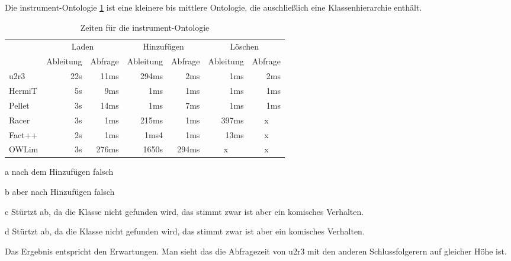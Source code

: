 Die instrument-Ontologie \ref{table-time-instrument} ist eine kleinere bis mittlere Ontologie, die auschließlich eine Klassenhierarchie enthält.

\begin{table}[htbp]
\caption{Zeiten für die instrument-Ontologie}
\label{table-time-instrument}
\begin{center}
\begin{threeparttable}
\begin{tabular}{l|r|r|r|r|r|r|}
\cline{2-7}
 & \multicolumn{2}{|c|}{Laden} & \multicolumn{2}{|c|}{Hinzufügen} & \multicolumn{2}{|c|}{Löschen} \\
\cline{2-7}
 & \multicolumn{1}{|c|}{Ableitung} & \multicolumn{1}{|c|}{Abfrage} & \multicolumn{1}{|c|}{Ableitung} & \multicolumn{1}{|c|}{Abfrage} & \multicolumn{1}{|c|}{Ableitung} & \multicolumn{1}{|c|}{Abfrage} \\
\hline
\multicolumn{1}{|l|}{u2r3} & 22s & 11ms & 294ms & 2ms & 1ms & 2ms \\ \hline
\multicolumn{1}{|l|}{HermiT\tnote{a}} & 5s & 9ms & 1ms & 1ms & 1ms & 1ms \\ \hline
\multicolumn{1}{|l|}{Pellet\tnote{b}} & 3s & 14ms & 1ms & 7ms & 1ms & 1ms \\ \hline
\multicolumn{1}{|l|}{Racer\tnote{c}} & 3s & 1ms & 215ms & 1ms & 397ms & \multicolumn{1}{c|}{x} \\ \hline
\multicolumn{1}{|l|}{Fact++\tnote{d}} & 2s & 1ms & 1ms4 & 1ms & 13ms & \multicolumn{1}{c|}{x} \\ \hline
\multicolumn{1}{|l|}{OWLim} & 3s & 276ms & 1650s & 294ms & \multicolumn{1}{c|}{x} & \multicolumn{1}{c|}{x} \\ \hline
\end{tabular}
\begin{tablenotes}
	\item[a] nach dem Hinzufügen falsch
	\item[b] aber nach Hinzufügen falsch
	\item[c] Stürtzt ab, da die Klasse nicht gefunden wird, das stimmt zwar ist aber ein komisches Verhalten.
	\item[d] Stürtzt ab, da die Klasse nicht gefunden wird, das stimmt zwar ist aber ein komisches Verhalten.
\end{tablenotes}
\end{threeparttable}
\end{center}
\end{table}

Das Ergebnis entspricht den Erwartungen. Man sieht das die Abfragezeit von u2r3 mit den anderen Schlussfolgerern auf gleicher Höhe ist.

